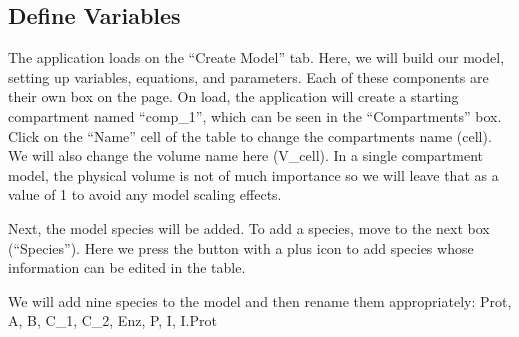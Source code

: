 \documentclass[letterpaper,10pt,english]{sphinxmanual}
\begin{document}
\subsection{Define Variables}
\label{\detokenize{pages/tutorial_sc/defineVariables:define-variables}}\label{\detokenize{pages/tutorial_sc/defineVariables::doc}}
\sphinxAtStartPar
The application loads on the “Create Model” tab.
Here, we will build our model, setting up variables, equations, and parameters.
Each of these components are their own box on the page.
On load, the application will create a starting compartment named “comp\_1”,
which can be seen in the “Compartments” box.
Click on the “Name” cell of the table to change the compartments name (cell).
We will also change the volume name here (V\_cell).
In a single compartment model, the physical volume is not of much importance
so we will leave that as a value of 1 to avoid any model scaling effects.

\begin{figure}[htbp]
\centering

\noindent{}
\end{figure}

\sphinxAtStartPar
Next, the model species will be added.  To add a species, move to the next box
(“Species”).  Here we press the button with a plus icon to add species whose
information can be edited in the table.

\begin{figure}[htbp]
\centering

\noindent{}
\end{figure}

\sphinxAtStartPar
We will add nine species to the model and then rename them appropriately:
Prot, A, B, C\_1, C\_2, Enz, P, I, I.Prot

\begin{figure}[htbp]
\centering

\noindent{}
\end{figure}
\end{document}

